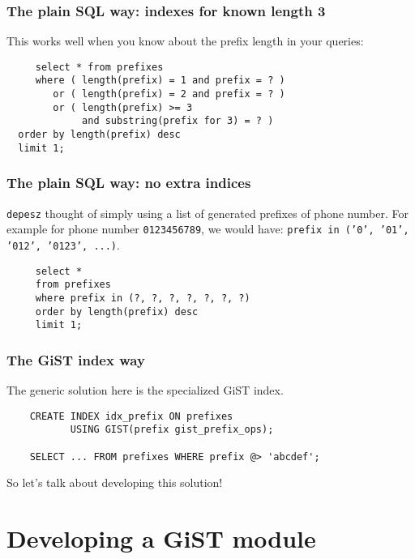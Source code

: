 \documentclass{beamer}
\begin{document}
\begin{frame}[fragile]
  \frametitle{The plain SQL way: indexes for known length 3}

  This works well when you know about the prefix length in your queries:

  \begin{example}
  \begin{verbatim}
     select * from prefixes
     where ( length(prefix) = 1 and prefix = ? )
        or ( length(prefix) = 2 and prefix = ? )
        or ( length(prefix) >= 3 
             and substring(prefix for 3) = ? )
  order by length(prefix) desc
  limit 1;
  \end{verbatim}
  \end{example}
\end{frame}

\begin{frame}[fragile]
  \frametitle{The plain SQL way: no extra indices}

   \texttt{depesz} thought of simply using a list of generated prefixes of
   phone number. For example for phone number \texttt{0123456789}, we would
   have: \texttt{prefix in ('0', '01', '012', '0123', ...)}.

  \begin{example}
  \begin{verbatim}
     select *
     from prefixes
     where prefix in (?, ?, ?, ?, ?, ?, ?)
     order by length(prefix) desc
     limit 1;
  \end{verbatim}
  \end{example}
\end{frame}

\begin{frame}[fragile]
  \frametitle{The GiST index way}

  The generic solution here is the specialized \alert{GiST} index.

  \begin{example}
  \begin{verbatim}
    CREATE INDEX idx_prefix ON prefixes
           USING GIST(prefix gist_prefix_ops);

    SELECT ... FROM prefixes WHERE prefix @> 'abcdef';
  \end{verbatim}
  \end{example}

  So let's talk about developing this solution!
\end{frame}


\section{Developing a GiST module}
\end{document}
